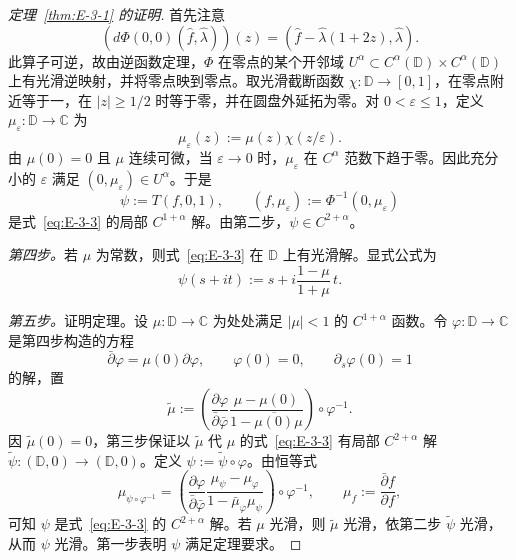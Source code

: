 \begin{proof}[定理~\ref{thm:E-3-1} 的证明]
首先注意
\[
  (d\Phi(0,0)(\hat f,\hat\lambda))(z)
  =(\hat f-\hat\lambda(1+2z),\hat\lambda).
\]
此算子可逆，故由逆函数定理，$\Phi$ 在零点的某个开邻域 $U^\alpha\subset C^\alpha(\mathbb D)\times C^\alpha(\mathbb D)$ 上有光滑逆映射，并将零点映到零点。取光滑截断函数 $\chi:\mathbb D\to[0,1]$，在零点附近等于一，在 $|z|\ge1/2$ 时等于零，并在圆盘外延拓为零。对 $0<\varepsilon\le1$，定义 $\mu_\varepsilon:\mathbb D\to\mathbb C$ 为
\[
  \mu_\varepsilon(z):=\mu(z)\chi(z/\varepsilon).
\]
由 $\mu(0)=0$ 且 $\mu$ 连续可微，当 $\varepsilon\to0$ 时，$\mu_\varepsilon$ 在 $C^\alpha$ 范数下趋于零。因此充分小的 $\varepsilon$ 满足 $(0,\mu_\varepsilon)\in U^\alpha$。于是
\[
  \psi:=T(f,0,1),\qquad (f,\mu_\varepsilon):=\Phi^{-1}(0,\mu_\varepsilon)
\]
是式~\eqref{eq:E-3-3} 的局部 $C^{1+\alpha}$ 解。由第二步，$\psi\in C^{2+\alpha}$。

\emph{第四步。}若 $\mu$ 为常数，则式~\eqref{eq:E-3-3} 在 $\mathbb D$ 上有光滑解。显式公式为
\[
  \psi(s+it):=s+i\frac{1-\mu}{1+\mu}\,t.
\]

\emph{第五步。}证明定理。设 $\mu:\mathbb D\to\mathbb C$ 为处处满足 $|\mu|<1$ 的 $C^{1+\alpha}$ 函数。令 $\varphi:\mathbb D\to\mathbb C$ 是第四步构造的方程
\[
  \bar\partial\varphi=\mu(0)\partial\varphi,\qquad
  \varphi(0)=0,\qquad\partial_s\varphi(0)=1
\]
的解，置
\[
  \widetilde\mu:=
  \left(\frac{\partial\varphi}{\bar\partial\bar\varphi}
  \frac{\mu-\mu(0)}{1-\overline{\mu(0)}\mu}\right)\circ\varphi^{-1}.
\]
因 $\widetilde\mu(0)=0$，第三步保证以 $\widetilde\mu$ 代 $\mu$ 的式~\eqref{eq:E-3-3} 有局部 $C^{2+\alpha}$ 解 $\widetilde\psi:(\mathbb D,0)\to(\mathbb D,0)$。定义 $\psi:=\widetilde\psi\circ\varphi$。由恒等式
\[
  \mu_{\psi\circ\varphi^{-1}}
  =\left(\frac{\partial\varphi}{\bar\partial\bar\varphi}
  \frac{\mu_\psi-\mu_\varphi}
  {1-\bar\mu_\varphi\mu_\psi}\right)\circ\varphi^{-1},
  \qquad \mu_f:=\frac{\bar\partial f}{\partial f},
\]
可知 $\psi$ 是式~\eqref{eq:E-3-3} 的 $C^{2+\alpha}$ 解。若 $\mu$ 光滑，则 $\widetilde\mu$ 光滑，依第二步 $\widetilde\psi$ 光滑，从而 $\psi$ 光滑。第一步表明 $\psi$ 满足定理要求。
\end{proof}
